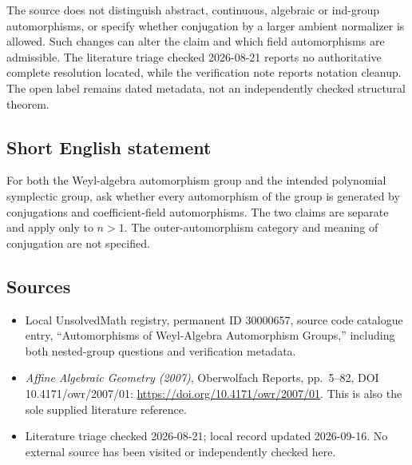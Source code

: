 \documentclass[11pt]{article}
\begin{document}
The source does not distinguish abstract, continuous, algebraic or ind-group automorphisms, or specify whether conjugation by a larger ambient normalizer is allowed. Such changes can alter the claim and which field automorphisms are admissible. The literature triage checked 2026-08-21 reports no authoritative complete resolution located, while the verification note reports notation cleanup. The open label remains dated metadata, not an independently checked structural theorem.
\subsection{Short English statement}
For both the Weyl-algebra automorphism group and the intended polynomial symplectic group, ask whether every automorphism of the group is generated by conjugations and coefficient-field automorphisms. The two claims are separate and apply only to \(n>1\). The outer-automorphism category and meaning of conjugation are not specified.
\subsection{Sources}
\begin{itemize}
\item Local UnsolvedMath registry, permanent ID 30000657, source code catalogue entry, ``Automorphisms of Weyl-Algebra Automorphism Groups,'' including both nested-group questions and verification metadata.
\item \emph{Affine Algebraic Geometry (2007)}, Oberwolfach Reports, pp.\ 5--82, DOI 10.4171/owr/2007/01: \url{https://doi.org/10.4171/owr/2007/01}. This is also the sole supplied literature reference.
\item Literature triage checked 2026-08-21; local record updated 2026-09-16. No external source has been visited or independently checked here.
\end{itemize}
\end{document}
